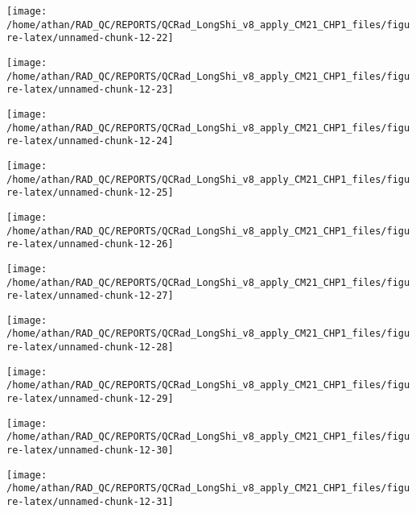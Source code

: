 \documentclass[
  10pt,
  a4paper,oneside]{article}
\begin{document}
\begin{center}\texttt{[image: /home/athan/RAD\_QC/REPORTS/QCRad\_LongShi\_v8\_apply\_CM21\_CHP1\_files/figure-latex/unnamed-chunk-12-22]} \end{center}

\begin{center}\texttt{[image: /home/athan/RAD\_QC/REPORTS/QCRad\_LongShi\_v8\_apply\_CM21\_CHP1\_files/figure-latex/unnamed-chunk-12-23]} \end{center}

\begin{center}\texttt{[image: /home/athan/RAD\_QC/REPORTS/QCRad\_LongShi\_v8\_apply\_CM21\_CHP1\_files/figure-latex/unnamed-chunk-12-24]} \end{center}

\begin{center}\texttt{[image: /home/athan/RAD\_QC/REPORTS/QCRad\_LongShi\_v8\_apply\_CM21\_CHP1\_files/figure-latex/unnamed-chunk-12-25]} \end{center}

\begin{center}\texttt{[image: /home/athan/RAD\_QC/REPORTS/QCRad\_LongShi\_v8\_apply\_CM21\_CHP1\_files/figure-latex/unnamed-chunk-12-26]} \end{center}

\begin{center}\texttt{[image: /home/athan/RAD\_QC/REPORTS/QCRad\_LongShi\_v8\_apply\_CM21\_CHP1\_files/figure-latex/unnamed-chunk-12-27]} \end{center}

\begin{center}\texttt{[image: /home/athan/RAD\_QC/REPORTS/QCRad\_LongShi\_v8\_apply\_CM21\_CHP1\_files/figure-latex/unnamed-chunk-12-28]} \end{center}

\begin{center}\texttt{[image: /home/athan/RAD\_QC/REPORTS/QCRad\_LongShi\_v8\_apply\_CM21\_CHP1\_files/figure-latex/unnamed-chunk-12-29]} \end{center}

\begin{center}\texttt{[image: /home/athan/RAD\_QC/REPORTS/QCRad\_LongShi\_v8\_apply\_CM21\_CHP1\_files/figure-latex/unnamed-chunk-12-30]} \end{center}

\begin{center}\texttt{[image: /home/athan/RAD\_QC/REPORTS/QCRad\_LongShi\_v8\_apply\_CM21\_CHP1\_files/figure-latex/unnamed-chunk-12-31]} \end{center}
\end{document}
